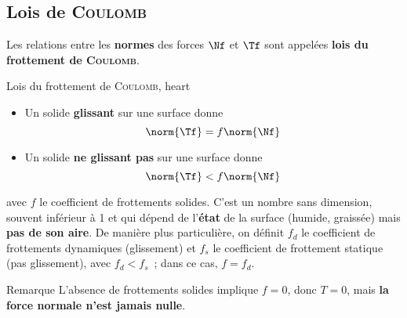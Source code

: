 \documentclass[../main/main.tex]{subfiles}
\begin{document}
\subsection{Lois de \textsc{Coulomb}}
Les relations entre les \textbf{normes} des forces $\Nf$ et $\Tf$ sont appelées
\textbf{lois du frottement de \textsc{Coulomb}}.

\begin{tprop}{Lois du frottement de \textsc{Coulomb}, heart}
    \begin{itemize}
        \item Un solide \textbf{glissant} sur une surface donne
            \[\norm{\Tf} = f\norm{\Nf}\]
        \item Un solide \textbf{ne glissant pas} sur une surface donne
            \[\norm{\Tf} < f\norm{\Nf}\]
    \end{itemize}
    avec $f$ le coefficient de frottements solides. C'est un nombre sans
    dimension, souvent inférieur à 1 et qui dépend de l'\textbf{état} de la
    surface (humide, graissée) mais \textbf{pas de son aire}. \bigbreak
    De manière plus particulière, on définit $f_d$ le coefficient de frottements
    dynamiques (glissement) et $f_s$ le coefficient de frottement statique (pas
    glissement), avec $f_d < f_s$~; dans ce cas, $f = f_d$.
\end{tprop}

\begin{rexem}{Remarque}
    L'absence de frottements solides implique $f=0$, donc $T = 0$, mais
    \textbf{la force normale n'est jamais nulle}.
\end{rexem}
\end{document}
